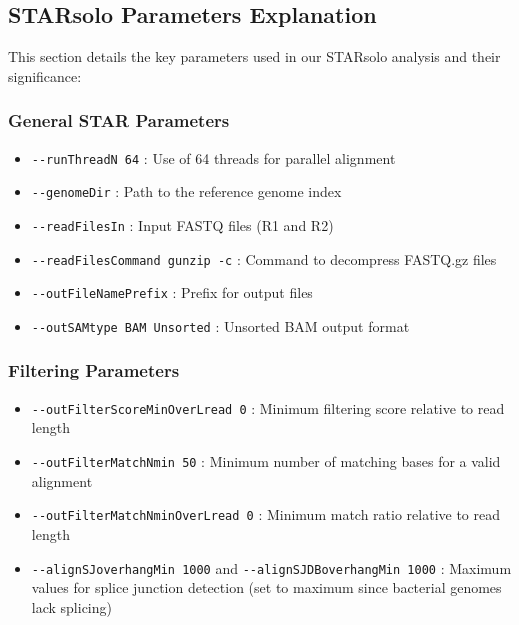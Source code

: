 \documentclass[
  11pt,
  a4paper,
]{report}
\providecommand{\tightlist}{%
  \setlength{\itemsep}{0pt}\setlength{\parskip}{0pt}}\usepackage{longtable,booktabs,array}
\begin{document}
\subsection{STARsolo Parameters
Explanation}\label{starsolo-parameters-explanation}

This section details the key parameters used in our STARsolo analysis
and their significance:

\subsubsection{General STAR Parameters}\label{general-star-parameters}

\begin{itemize}
\tightlist
\item
  \texttt{-\/-runThreadN\ 64} : Use of 64 threads for parallel alignment
\item
  \texttt{-\/-genomeDir} : Path to the reference genome index
\item
  \texttt{-\/-readFilesIn} : Input FASTQ files (R1 and R2)
\item
  \texttt{-\/-readFilesCommand\ gunzip\ -c} : Command to decompress
  FASTQ.gz files
\item
  \texttt{-\/-outFileNamePrefix} : Prefix for output files
\item
  \texttt{-\/-outSAMtype\ BAM\ Unsorted} : Unsorted BAM output format
\end{itemize}

\subsubsection{Filtering Parameters}\label{filtering-parameters}

\begin{itemize}
\tightlist
\item
  \texttt{-\/-outFilterScoreMinOverLread\ 0} : Minimum filtering score
  relative to read length
\item
  \texttt{-\/-outFilterMatchNmin\ 50} : Minimum number of matching bases
  for a valid alignment
\item
  \texttt{-\/-outFilterMatchNminOverLread\ 0} : Minimum match ratio
  relative to read length
\item
  \texttt{-\/-alignSJoverhangMin\ 1000} and
  \texttt{-\/-alignSJDBoverhangMin\ 1000} : Maximum values for splice
  junction detection (set to maximum since bacterial genomes lack
  splicing)
\end{itemize}
\end{document}
